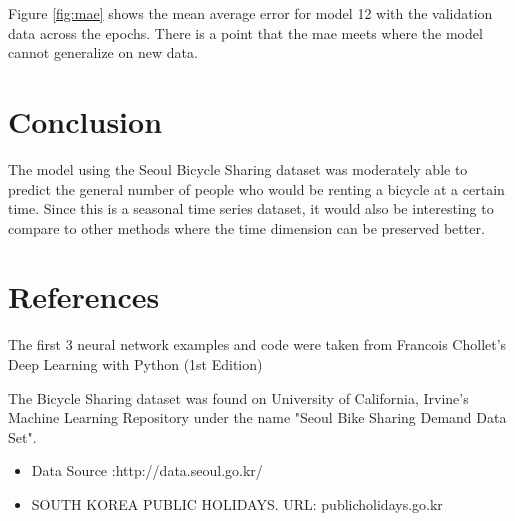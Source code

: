 \documentclass{article}
\begin{document}
    Figure \ref{fig:mae} shows the mean average error for model 12 with the validation data across the epochs. There is a point that the mae 
    meets where the model cannot generalize on new data.

\section{Conclusion}
    The model using the Seoul Bicycle Sharing dataset was moderately able to predict the general number of people who would be renting a bicycle 
    at a certain time. Since this is a seasonal time series dataset, it would also be interesting to compare to other methods where the time 
    dimension can be preserved better.

\section{References}
    The first 3 neural network examples and code were taken from Francois Chollet's Deep Learning with Python (1st Edition) 
    
    
    The Bicycle Sharing dataset was found on University of California, Irvine's Machine Learning Repository 
    under the name "Seoul Bike Sharing Demand Data Set".
    \begin{itemize}
        \item Data Source :http://data.seoul.go.kr/
        \item SOUTH KOREA PUBLIC HOLIDAYS. URL: publicholidays.go.kr
      \end{itemize}
\end{document}
